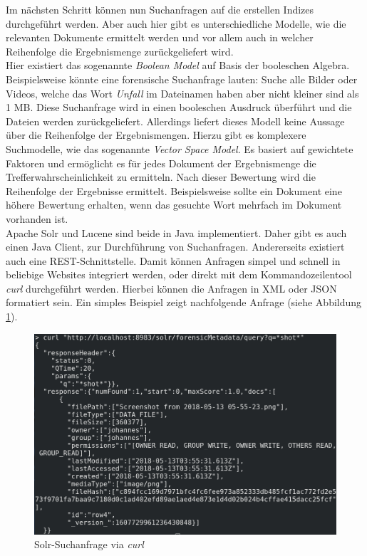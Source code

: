 \noindent
Im nächsten Schritt können nun Suchanfragen auf die erstellen Indizes durchgeführt werden. Aber auch hier gibt es unterschiedliche Modelle, wie die relevanten Dokumente ermittelt werden und vor allem auch in welcher Reihenfolge die Ergebnismenge zurückgeliefert wird.\\
Hier existiert das sogenannte \textit{Boolean Model} auf Basis der booleschen Algebra. Beispielsweise könnte eine forensische Suchanfrage lauten: Suche alle Bilder oder Videos, welche das Wort \textit{Unfall} im Dateinamen haben aber nicht kleiner sind als 1 MB. Diese Suchanfrage wird in einen booleschen Ausdruck überführt und die Dateien werden zurückgeliefert. Allerdings liefert dieses Modell keine Aussage über die Reihenfolge der Ergebnismengen. Hierzu gibt es komplexere Suchmodelle, wie das sogenannte \textit{Vector Space Model}. Es basiert auf gewichtete Faktoren und ermöglicht es für jedes Dokument der Ergebnismenge die Trefferwahrscheinlichkeit zu ermitteln. Nach dieser Bewertung wird die Reihenfolge der Ergebnisse ermittelt. Beispielsweise sollte ein Dokument eine höhere Bewertung erhalten, wenn das gesuchte Wort mehrfach im Dokument vorhanden ist.\cite[S. 47 ff]{solr_search}\\

\noindent
Apache Solr und Lucene sind beide in Java implementiert. Daher gibt es auch einen Java Client, zur Durchführung von Suchanfragen. Andererseits existiert auch eine REST-Schnittstelle. Damit können Anfragen simpel und schnell in beliebige Websites integriert werden, oder direkt mit dem Kommandozeilentool \textit{curl} durchgeführt werden. Hierbei können die Anfragen in XML oder JSON formatiert sein. Ein simples Beispiel zeigt nachfolgende Anfrage (siehe Abbildung \ref{fig:solr_request}).\\

\begin{figure}[ht]
  \centering
  \includegraphics[width=\textwidth]{./resource/solr_request.png}
  \caption{Solr-Suchanfrage via \textit{curl}}
  \label{fig:solr_request}
\end{figure}

